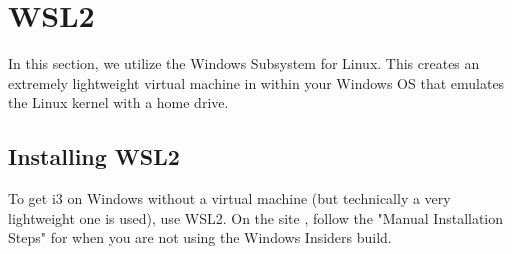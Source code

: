\chapter{WSL2} \label{ChapWSL2}

In this section, we utilize the Windows Subsystem for Linux. This creates an
extremely lightweight virtual machine in within your Windows OS that emulates
the Linux kernel with a home drive.

\section{Installing WSL2}
To get i3 on Windows without a virtual machine (but technically a very
lightweight one is used), use WSL2. On the site \cite{microsoft2020wsl} , follow
the "Manual Installation Steps" for when you are not using the Windows Insiders
build.
